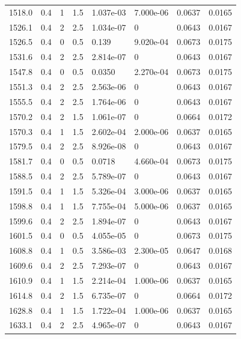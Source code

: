 \documentclass[preview]{standalone}
\begin{document}
{{{\begin{tabular}{L{1.2cm}C{1.2cm} C{0.3cm}C{0.5cm} C{1.4cm}C{1.4cm} C{1.4cm}C{1.4cm}}
  1518.0  &   0.4  & 1     & 1.5 &  1.037e-03  & 7.000e-06  & 0.0637 &  0.0165   \\ 
  1526.1  &   0.4  & 2     & 2.5 &  1.034e-07  & 0  & 0.0643 &  0.0167   \\ 
  1526.5  &   0.4  & 0     & 0.5 &  0.139  & 9.020e-04  & 0.0673 &  0.0175   \\ 
  1531.6  &   0.4  & 2     & 2.5 &  2.814e-07  & 0  & 0.0643 &  0.0167   \\ 
  1547.8  &   0.4  & 0     & 0.5 &  0.0350  & 2.270e-04  & 0.0673 &  0.0175   \\ 
  1551.3  &   0.4  & 2     & 2.5 &  2.563e-06  & 0  & 0.0643 &  0.0167   \\ 
  1555.5  &   0.4  & 2     & 2.5 &  1.764e-06  & 0  & 0.0643 &  0.0167   \\ 
  1570.2  &   0.4  & 2     & 1.5 &  1.061e-07  & 0  & 0.0664 &  0.0172   \\ 
  1570.3  &   0.4  & 1     & 1.5 &  2.602e-04  & 2.000e-06  & 0.0637 &  0.0165   \\ 
  1579.5  &   0.4  & 2     & 2.5 &  8.926e-08  & 0  & 0.0643 &  0.0167   \\ 
  1581.7  &   0.4  & 0     & 0.5 &  0.0718  & 4.660e-04  & 0.0673 &  0.0175   \\ 
  1588.5  &   0.4  & 2     & 2.5 &  5.789e-07  & 0  & 0.0643 &  0.0167   \\ 
  1591.5  &   0.4  & 1     & 1.5 &  5.326e-04  & 3.000e-06  & 0.0637 &  0.0165   \\ 
  1598.8  &   0.4  & 1     & 1.5 &  7.755e-04  & 5.000e-06  & 0.0637 &  0.0165   \\ 
  1599.6  &   0.4  & 2     & 2.5 &  1.894e-07  & 0  & 0.0643 &  0.0167   \\ 
  1601.5  &   0.4  & 0     & 0.5 &  4.055e-05  & 0  & 0.0673 &  0.0175   \\ 
  1608.8  &   0.4  & 1     & 0.5 &  3.586e-03  & 2.300e-05  & 0.0647 &  0.0168   \\ 
  1609.6  &   0.4  & 2     & 2.5 &  7.293e-07  & 0  & 0.0643 &  0.0167   \\ 
  1610.9  &   0.4  & 1     & 1.5 &  2.214e-04  & 1.000e-06  & 0.0637 &  0.0165   \\ 
  1614.8  &   0.4  & 2     & 1.5 &  6.735e-07  & 0  & 0.0664 &  0.0172   \\ 
  1628.8  &   0.4  & 1     & 1.5 &  1.722e-04  & 1.000e-06  & 0.0637 &  0.0165   \\ 
  1633.1  &   0.4  & 2     & 2.5 &  4.965e-07  & 0  & 0.0643 &  0.0167   \\ 

\end{tabular}}}}
\end{document}
